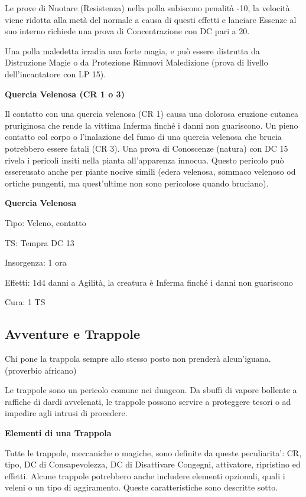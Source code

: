 \documentclass[a4paper,11pt,twoside,openany]{book}
\begin{document}
Le prove di Nuotare (Resistenza) nella polla subiscono penalità -10, la velocità viene ridotta alla metà del normale a causa di questi effetti e lanciare Essenze al suo interno richiede una prova di Concentrazione con DC pari a 20.

Una polla maledetta irradia una forte magia, e può essere distrutta da Distruzione Magie o da Protezione Rimuovi Maledizione (prova di livello dell'incantatore
con LP 15).

\textbf{Quercia Velenosa (CR 1 o 3)}

Il contatto con una quercia velenosa (CR 1) causa una dolorosa eruzione cutanea pruriginosa che rende la vittima Inferma finché i danni non guariscono. Un pieno contatto col corpo o l'inalazione del fumo di una quercia velenosa che brucia potrebbero essere fatali (CR 3). Una prova di Conoscenze (natura) con DC 15 rivela i pericoli insiti nella pianta all'apparenza innocua. Questo pericolo può essereusato anche per piante nocive simili (edera velenosa, sommaco velenoso od ortiche pungenti, ma quest'ultime non sono pericolose quando bruciano).

\textbf{Quercia Velenosa}

Tipo: Veleno, contatto

TS: Tempra DC 13

Insorgenza: 1 ora

Effetti: 1d4 danni a Agilità, la creatura è Inferma finché i danni
non guariscono

Cura: 1 TS

\pagebreak

\subsection{Avventure e Trappole}

\label{avventure-e-trappole}
\begin{tcolorbox}[enhanced,arc=5pt,boxrule=0.3pt]{Chi pone la trappola sempre allo stesso posto non prenderà alcun'iguana. (proverbio africano)}\end{tcolorbox}\medskip

Le trappole sono un pericolo comune nei dungeon. Da sbuffi di vapore bollente a raffiche di dardi avvelenati, le trappole possono servire a proteggere tesori o ad impedire agli intrusi di procedere.

\textbf{Elementi di una Trappola}

Tutte le trappole, meccaniche o magiche, sono definite da queste peculiarita': CR, tipo, DC di Consapevolezza, DC di Disattivare Congegni, attivatore, ripristino ed effetti. Alcune trappole potrebbero anche includere elementi opzionali, quali i veleni o un tipo di aggiramento. Queste caratteristiche sono descritte sotto.
\end{document}
